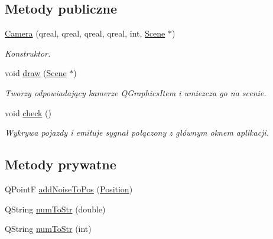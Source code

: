\subsection*{Metody publiczne}
\begin{DoxyCompactItemize}
\item 
\hyperlink{class_camera_aada4c36f1a6dfc8cfd71a6adc65ce37f}{Camera} (qreal, qreal, qreal, qreal, int, \hyperlink{class_scene}{Scene} $\ast$)
\begin{DoxyCompactList}\small\item\em Konstruktor. \end{DoxyCompactList}\item 
void \hyperlink{class_camera_a3dbc4d339b7245dd98716da34e323bb8}{draw} (\hyperlink{class_scene}{Scene} $\ast$)
\begin{DoxyCompactList}\small\item\em Tworzy odpowiadający kamerze Q\-Graphics\-Item i umiezcza go na scenie. \end{DoxyCompactList}\item 
void \hyperlink{class_camera_aad77e2d85f7b0445eed867f85ba1811e}{check} ()
\begin{DoxyCompactList}\small\item\em Wykrywa pojazdy i emituje sygnał połączony z głównym oknem aplikacji. \end{DoxyCompactList}\end{DoxyCompactItemize}
\subsection*{Metody prywatne}
\begin{DoxyCompactItemize}
\item 
Q\-Point\-F \hyperlink{class_camera_a9c751a6ce1b3ef4d7e2049db4c8bc81c}{add\-Noise\-To\-Pos} (\hyperlink{struct_position}{Position})
\item 
Q\-String \hyperlink{class_camera_a31954d7d988e4113688ce4952f4de4ac}{num\-To\-Str} (double)
\item 
Q\-String \hyperlink{class_camera_a639a82d63e7ac13195e7111a3d1163db}{num\-To\-Str} (int)
\end{DoxyCompactItemize}
